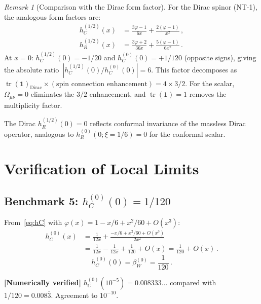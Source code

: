 \documentclass[11pt,a4paper]{article}
\newcommand{\Id}{\mathbf{1}}
\newcommand{\tr}{\operatorname{tr}}
\theoremstyle{definition}
\theoremstyle{remark}
\newtheorem{remark}[theorem]{Remark}
\newcommand{\verified}[1]{%
  \par\noindent\colorbox{green!10}{%
    \parbox{\dimexpr\linewidth-2\fboxsep}{%
      \textcolor{green!50!black}{\textbf{[Numerically verified]}}
      \textcolor{green!50!black}{#1}%
    }%
  }\par%
}
\begin{document}
\begin{remark}[Comparison with the Dirac form factor]
For the Dirac spinor (NT-1), the analogous form factors are:
\begin{align*}
  h_C^{(1/2)}(x) &= \frac{3\varphi-1}{6x}
  + \frac{2(\varphi-1)}{x^2}\,,\\[4pt]
  h_R^{(1/2)}(x) &= \frac{3\varphi+2}{36x}
  + \frac{5(\varphi-1)}{6x^2}\,.
\end{align*}
At $x = 0$: $h_C^{(1/2)}(0) = -1/20$ and
$h_C^{(0)}(0) = +1/120$ (opposite signs), giving the
absolute ratio~$|h_C^{(1/2)}(0)/h_C^{(0)}(0)| = 6$.  This factor
decomposes as $\tr(\Id)_{\text{Dirac}} \times
(\text{spin connection enhancement}) = 4 \times 3/2$.
For the scalar, $\Omega_{\mu\nu} = 0$ eliminates the $3/2$
enhancement, and $\tr(\Id) = 1$ removes the multiplicity factor.

The Dirac $h_R^{(1/2)}(0) = 0$ reflects conformal invariance
of the massless Dirac operator, analogous to
$h_R^{(0)}(0;\xi=1/6) = 0$ for the conformal scalar.
\end{remark}


\section{Verification of Local Limits}
\label{sec:local-limits}

\subsection{Benchmark 5: $h_C^{(0)}(0) = 1/120$}

From~\eqref{eq:hC} with $\varphi(x) = 1 - x/6 + x^2/60 + O(x^3)$:
\begin{align}
  h_C^{(0)}(x) &= \frac{1}{12x}
  + \frac{-x/6 + x^2/60 + O(x^3)}{2x^2}
  \nonumber\\
  &= \frac{1}{12x} - \frac{1}{12x} + \frac{1}{120} + O(x)
  = \frac{1}{120} + O(x)\,.
  \label{eq:hC-local}
\end{align}
\begin{equation}
  \boxed{h_C^{(0)}(0) = \beta_W^{(0)} = \frac{1}{120}\,.}
  \label{eq:benchmark5}
\end{equation}

\verified{$h_C^{(0)}(10^{-5}) = 0.008333\ldots$ compared with
$1/120 = 0.008\overline{3}$.  Agreement to $10^{-10}$.}
\end{document}
